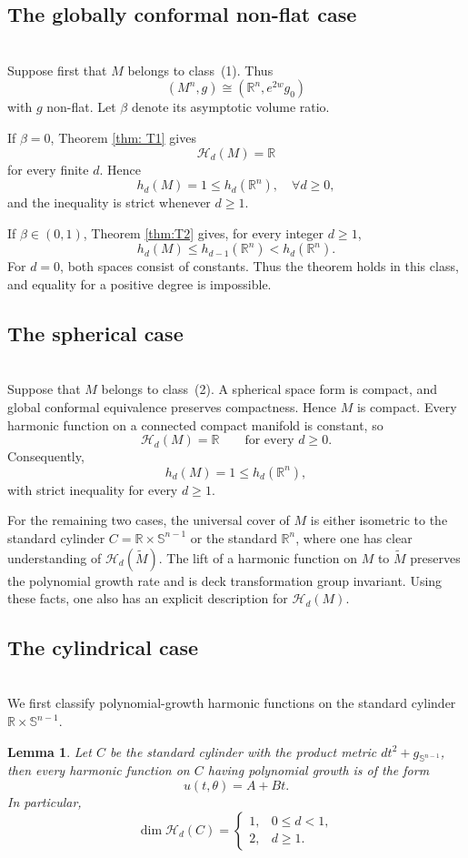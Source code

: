 \documentclass[12pt]{amsart}
\theoremstyle{plain}
\newtheorem{lemma}[theorem]{Lemma}
\theoremstyle{definition}
\theoremstyle{remark}     %
\numberwithin{equation}{section}
\begin{document}
 
\subsection{The globally conformal non-flat case}
\ \\
Suppose first that $M$ belongs to class~(1). Thus
\[
    (M^n,g)\cong (\mathbb R^n,e^{2w}g_0)
\]
with $g$ non-flat.  Let $\beta$ denote its asymptotic volume ratio.

If $\beta=0$, Theorem \ref{thm: T1} gives
\[
    \mathcal H_d(M)=\mathbb R
\]
for every finite $d$. Hence
\[    h_d(M)=1\leq h_d(\mathbb R^n),\quad 
    \forall d\geq 0,
\]
and the inequality is strict whenever $d\geq1$.

If $\beta\in(0,1)$, Theorem \ref{thm:T2} gives, for every
integer $d\geq1$,
\[
    h_d(M)
    \leq h_{d-1}(\mathbb R^n)
    < h_d(\mathbb R^n).
\]
For $d=0$, both spaces consist of constants. Thus the theorem holds in
this class, and equality for a positive degree is impossible.

\subsection{The spherical case}
\ \\
Suppose that $M$ belongs to class~(2). A spherical space form is compact,
and global conformal equivalence preserves compactness.  Hence $M$ is
compact.  Every harmonic function on a connected compact manifold is
constant, so
\[
    \mathcal H_d(M)=\mathbb R
    \qquad\text{for every }d\geq0.
\]
Consequently,
\[
    h_d(M)=1\leq h_d(\mathbb R^n),
\]
with strict inequality for every $d\geq1$.


For the remaining two cases, the universal cover of $M$ is either isometric to the standard cylinder $C=\mathbb{R}\times \mathbb{S}^{n-1}$ or the standard $\mathbb{R}^n$, where one has clear understanding of $\mathcal{H}_d(\widetilde{M})$. The lift of a harmonic function on $M$ to $\widetilde{M}$ preserves the polynomial growth rate and is deck transformation group invariant. Using these facts, one also has  an explicit description for $\mathcal{H}_{d}(M)$.

\subsection{The cylindrical case}
\ \\
We first classify polynomial-growth harmonic functions on the standard cylinder $\mathbb{R}\times \mathbb{S}^{n-1}$.
\begin{lemma}
\label{lem:cylinder-harmonic-functions}
Let $C$ be the standard cylinder with the product metric $dt^2+g_{\mathbb S^{n-1}}$,
then every harmonic function on $C$ having polynomial growth is of the form
\begin{equation}\label{eq:cylinder-affine-form}
    u(t,\theta)=A+Bt.
\end{equation}
In particular,
\[
    \dim\mathcal H_d(C)
    =
    \begin{cases}
        1,&0\leq d<1,\\
        2,&d\geq1.
    \end{cases}
\]
\end{lemma}
\end{document}
